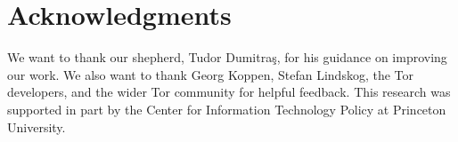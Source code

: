 \section*{Acknowledgments}
We want to thank our shepherd, Tudor Dumitra\c{s}, for his guidance on
improving our work.  We also want to thank Georg Koppen, Stefan Lindskog, the
Tor developers, and the wider Tor community for helpful feedback.  This
research was supported in part by the Center for Information Technology Policy
at Princeton University.
